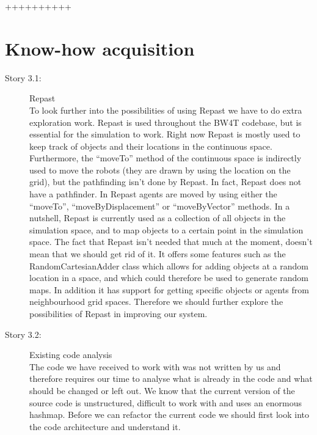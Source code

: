 ++++++++++\documentclass{article}
\begin{document}
\section{Know-how acquisition}
\begin{description}
\item[Story 3.1:] Repast\\
To look further into the possibilities of using Repast we have to do extra exploration work.
Repast is used throughout the BW4T codebase, but is essential for the simulation to work.
Right now Repast is mostly used to keep track of objects and their locations in the continuous space.
Furthermore, the ``moveTo'' method of the continuous space is indirectly used to move the robots (they are drawn by using the location on the grid), but the pathfinding isn't done by Repast.
In fact, Repast does not have a pathfinder.
In Repast agents are moved by using either the ``moveTo'', ``moveByDisplacement'' or ``moveByVector'' methods.
In a nutshell, Repast is currently used as a collection of all objects in the simulation space, and to map objects to a certain point in the simulation space.
The fact that Repast isn't needed that much at the moment, doesn't mean that we should get rid of it.
It offers some features such as the RandomCartesianAdder class which allows for adding objects at a random location in a space, and which could therefore be used to generate random maps.
In addition it has support for getting specific objects or agents from neighbourhood grid spaces.
Therefore we should further explore the possibilities of Repast in improving our system.
\end{description}

\begin{description}
\item[Story 3.2:] Existing code analysis\\
The code we have received to work with was not written by us and therefore requires our time to analyse what is already in the code and what should be changed or left out.
We know that the current version of the source code is unstructured, difficult to work with and uses an enormous hashmap.
Before we can refactor the current code we should first look into the code architecture and understand it.
\end{description}
\end{document}

